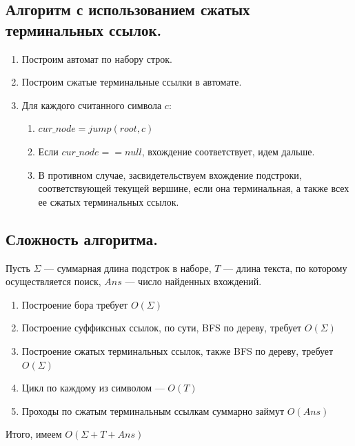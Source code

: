 \subsection{Алгоритм с использованием сжатых терминальных ссылок.}
\begin{enumerate}
    \item Построим автомат по набору строк.
    \item Построим сжатые терминальные ссылки в автомате.
    \item Для каждого считанного символа $c$:
        \begin{enumerate}
            \item $cur\_node = jump(root, c)$
            \item Если $cur\_node == null$, вхождение соответствует, идем дальше.
            \item В противном случае, засвидетельствуем вхождение подстроки, соответствующей текущей вершине, если она терминальная, а также всех ее сжатых терминальных ссылок.
        \end{enumerate}
\end{enumerate}

\subsection{Сложность алгоритма.}
Пусть $\Sigma$ --- суммарная длина подстрок в наборе,  $T$ --- длина текста, по которому осуществляется поиск, $Ans$ --- число найденных вхождений.

\begin{enumerate}
    \item Построение бора требует $O(\Sigma)$
    \item Построение суффиксных ссылок, по сути, BFS по дереву, требует  $O(\Sigma)$
    \item Построение сжатых терминальных ссылок, также BFS по дереву, требует $O(\Sigma)$
    \item Цикл по каждому из символом --- $O(T)$
    \item Проходы по сжатым терминальным ссылкам суммарно займут  $O(Ans)$
\end{enumerate}

Итого, имеем $O(\Sigma + T + Ans)$
